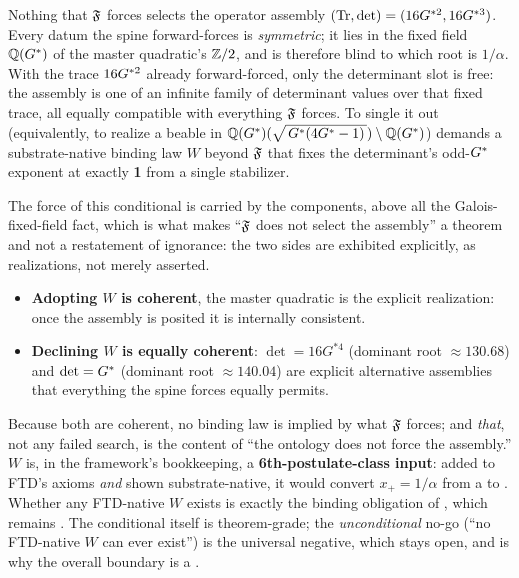 \begin{forcedbox}
Nothing that $\mathfrak{F}$ forces selects the operator assembly
$(\operatorname{Tr},\operatorname{det})=(16G^{*2},16G^{*3})$. Every datum the spine forward-forces is
\emph{symmetric}; it lies in the fixed field $\mathbb{Q}(G^{*})$ of the master
quadratic's $\mathbb{Z}/2$, and is therefore blind to which root is $1/\alpha$. With the
trace $16G^{*2}$ already forward-forced, only the determinant slot is free: the
assembly is one of an infinite family of determinant values over that fixed
trace, all equally compatible with everything $\mathfrak{F}$ forces. To single it out (equivalently,
to realize a beable in $\mathbb{Q}(G^{*})(\sqrt{\,G^{*}(4G^{*} - 1)\,})\setminus\mathbb{Q}(G^{*})$) demands a
substrate-native binding law $W$ beyond $\mathfrak{F}$ that fixes the determinant's
odd-$G^{*}$ exponent at exactly \textbf{1} from a single stabilizer.
\end{forcedbox}

\noindent The force of this conditional is carried by the 
components, above all the Galois-fixed-field fact, which is what makes
``$\mathfrak{F}$ does not select the assembly'' a theorem and not a restatement of
ignorance: the two sides are exhibited explicitly, as realizations, not merely
asserted.
\begin{itemize}[leftmargin=1.4em, itemsep=3pt]
  \item \textbf{Adopting $W$ is coherent}, the master quadratic is the
        explicit realization: once the assembly is posited it is internally
        consistent.
  \item \textbf{Declining $W$ is equally coherent}: $\det=16G^{*4}$ (dominant
        root $\approx130.68$) and $\det=G^{*}$ (dominant root $\approx140.04$) are
        explicit alternative assemblies that everything the spine forces equally
        permits.
\end{itemize}
Because both are coherent, no binding law is implied by what $\mathfrak{F}$
forces; and \emph{that}, not any failed search, is the content of ``the
ontology does not force the assembly.'' $W$ is, in the framework's bookkeeping, a
\textbf{6th-postulate-class input}: added to FTD's axioms \emph{and} shown
substrate-native, it would convert $x_+=1/\alpha$ from a  to
. Whether any FTD-native $W$ exists is exactly the binding
obligation of , which remains . The conditional
itself is theorem-grade; the \emph{unconditional} no-go (``no FTD-native $W$
can ever exist'') is the universal negative, which stays open, and is why the
overall boundary is a .

